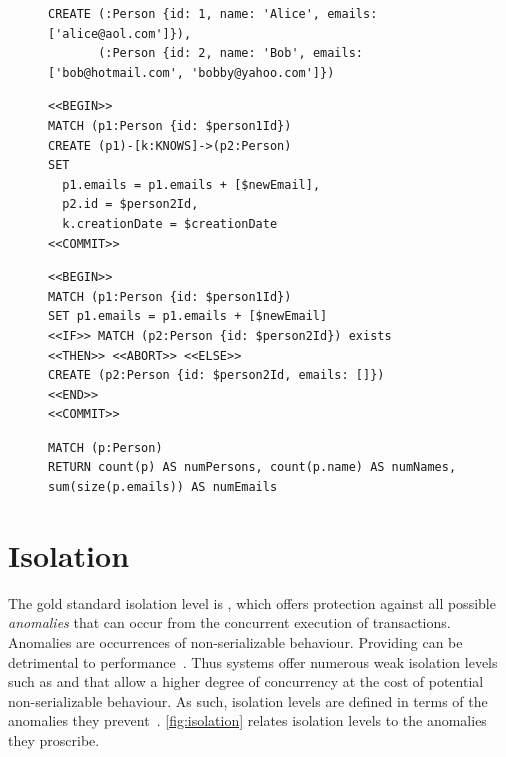 \begin{figure}[htb]
\centering

\begin{lstlisting}[language=cypher,label=fig:ainitial,caption=Cypher query for creating initial data for the \tx{Atomicity} transactions.]
CREATE (:Person {id: 1, name: 'Alice', emails: ['alice@aol.com']}),
       (:Person {id: 2, name: 'Bob', emails: ['bob@hotmail.com', 'bobby@yahoo.com']})
\end{lstlisting}

\begin{minipage}{0.41\linewidth}
\begin{lstlisting}[language=cypher,label=fig:ac,caption=\tx{Atomicity-C Tx.}]
<<BEGIN>>
MATCH (p1:Person {id: $person1Id})
CREATE (p1)-[k:KNOWS]->(p2:Person)
SET
  p1.emails = p1.emails + [$newEmail],
  p2.id = $person2Id,
  k.creationDate = $creationDate
<<COMMIT>>
\end{lstlisting}
\end{minipage}
\quad
\begin{minipage}{0.52\linewidth}
\begin{lstlisting}[language=cypher,label=fig:arb,caption=\tx{Atomicity-RB Tx.}]
<<BEGIN>>
MATCH (p1:Person {id: $person1Id})
SET p1.emails = p1.emails + [$newEmail]
<<IF>> MATCH (p2:Person {id: $person2Id}) exists
<<THEN>> <<ABORT>> <<ELSE>>
CREATE (p2:Person {id: $person2Id, emails: []})
<<END>>
<<COMMIT>>
\end{lstlisting}
\end{minipage}

\begin{lstlisting}[language=cypher,label=fig:acheck,caption=\tx{Atomicity-C/Atomicity-RB:} counting entities in the graph.]
MATCH (p:Person)
RETURN count(p) AS numPersons, count(p.name) AS numNames, sum(size(p.emails)) AS numEmails
\end{lstlisting}
\end{figure}

\section{Isolation}
\label{sec:isolation}

The gold standard isolation level is , which offers protection against all possible \emph{anomalies} that can occur from the concurrent execution of transactions.
Anomalies are occurrences of non-serializable behaviour.
Providing  can be detrimental to performance~\cite{DBLP:conf/ds/GrayLPT76}.
Thus systems offer numerous weak isolation levels such as  and  that allow a higher degree of concurrency at the cost of potential non-serializable behaviour.
As such, isolation levels are defined in terms of the anomalies they prevent~\cite{DBLP:conf/ds/GrayLPT76,DBLP:journals/pvldb/BailisDFGHS13}.
\autoref{fig:isolation} relates isolation levels to the anomalies they proscribe.

